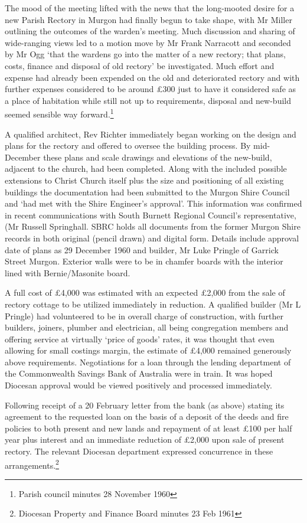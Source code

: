 The mood of the meeting lifted with the news that the long-mooted desire
for a new Parish Rectory in Murgon had finally begun to take shape, with
Mr Miller outlining the outcomes of the warden's meeting. Much
discussion and sharing of wide-ranging views led to a motion move by Mr
Frank Narracott and seconded by Mr Ogg `that the wardens go into the
matter of a new rectory; that plans, costs, finance and disposal of old
rectory' be investigated. Much effort and expense had already been
expended on the old and deteriorated rectory and with further expenses
considered to be around £300 just to have it considered safe as a place
of habitation while still not up to requirements, disposal and new-build
seemed sensible way forward.\footnote{Parish council minutes 28 November
  1960}

A qualified architect, Rev Richter immediately began working on the
design and plans for the rectory and offered to oversee the building
process. By mid-December these plans and scale drawings and elevations
of the new-build, adjacent to the church, had been completed. Along with
the included possible extensions to Christ Church itself plus the size
and positioning of all existing buildings the documentation had been
submitted to the Murgon Shire Council and `had met with the Shire
Engineer's approval'. This information was confirmed in recent
communications with South Burnett Regional Council's representative, (Mr
Russell Springhall. SBRC holds all documents from the former Murgon
Shire records in both original (pencil drawn) and digital form. Details
include approval date of plans as 29 December 1960 and builder, Mr Luke
Pringle of Garrick Street Murgon. Exterior walls were to be in chamfer
boards with the interior lined with Bernie/Masonite board.

A full cost of £4,000 was estimated with an expected £2,000 from the
sale of rectory cottage to be utilized immediately in reduction. A
qualified builder (Mr L Pringle) had volunteered to be in overall charge
of construction, with further builders, joiners, plumber and
electrician, all being congregation members and offering service at
virtually `price of goods' rates, it was thought that even allowing for
small costings margin, the estimate of £4,000 remained generously above
requirements. Negotiations for a loan through the lending department of
the Commonwealth Savings Bank of Australia were in train. It was hoped
Diocesan approval would be viewed positively and processed immediately.

Following receipt of a 20 February letter from the bank (as above)
stating its agreement to the requested loan on the basis of a deposit of
the deeds and fire policies to both present and new lands and repayment
of at least £100 per half year plus interest and an immediate reduction
of £2,000 upon sale of present rectory. The relevant Diocesan department
expressed concurrence in these arrangements.\footnote{Diocesan Property
  and Finance Board minutes 23 Feb 1961}

